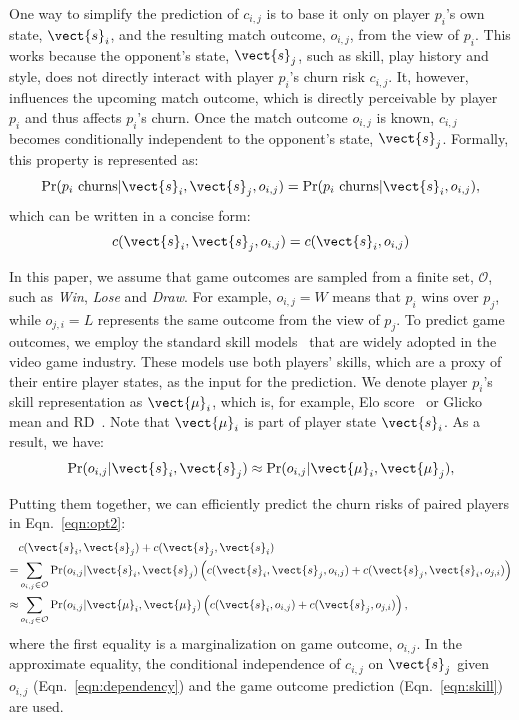 One way to simplify the prediction of $c_{i,j}$ is to base it only on player $p_i$'s own state, $\vect{s}_i$, and the resulting match outcome, $o_{i,j}$, from the view of $p_i$. This works because the opponent's state, $\vect{s}_j$, such as skill, play history and style, does not directly interact with player $p_i$'s churn risk $c_{i,j}$. It, however, influences the upcoming match outcome, which is directly perceivable by player $p_i$ and thus affects $p_i$'s churn. Once the match outcome $o_{i,j}$ is known, $c_{i,j}$ becomes conditionally independent to the opponent's state, $\vect{s}_j$. Formally, this property is represented as:
\begin{equation}\label{eqn:dependency_raw}
\Pr(p_i \text{ churns} | \vect{s}_i, \vect{s}_j, o_{i,j}) = \Pr(p_i \text{ churns} | \vect{s}_i, o_{i,j}),
\end{equation}
which can be written in a concise form:
\begin{equation}\label{eqn:dependency}
c(\vect{s}_i, \vect{s}_j, o_{i,j}) = c(\vect{s}_i, o_{i,j})
\end{equation}

In this paper, we assume that game outcomes are sampled from a finite set, $\mathcal{O}$, such as \emph{Win}, \emph{Lose} and \emph{Draw}. For example, $o_{i,j}=W$ means that $p_i$ wins over $p_j$, while $o_{j,i}=L$ represents the same outcome from the view of $p_j$. To predict game outcomes, we employ the standard skill models~\cite{elo1978rating,glickman1999parameter} that are widely adopted in the video game industry. These models use both players' skills, which are a proxy of their entire player states, as the input for the prediction. We denote player $p_i$'s skill representation as $\vect{\mu}_i$, which is, for example, Elo score~\cite{elo1978rating} or Glicko mean and RD~\cite{glickman1999parameter}. Note that $\vect{\mu}_i$ is part of player state $\vect{s}_i$.  As a result, we have:
\begin{equation}\label{eqn:skill}
\Pr(o_{i,j}|\vect{s}_i, \vect{s}_j) \approx \Pr(o_{i,j}|\vect{\mu}_i, \vect{\mu}_j),
\end{equation}

Putting them together, we can efficiently predict the churn risks of paired players in Eqn.~\ref{eqn:opt2}:
\begin{align}
&c(\vect{s}_i, \vect{s}_j) + c(\vect{s}_j, \vect{s}_i) \label{eqn:c1} \\
=& \sum\limits_{o_{i,j} \in \mathcal{O}} \Pr(o_{i,j}|\vect{s}_i, \vect{s}_j)\left( c(\vect{s}_i, \vect{s}_j, o_{i,j}) + c(\vect{s}_j, \vect{s}_i, o_{j,i}) \right) \label{eqn:c2} \\
\approx & \sum\limits_{o_{i,j} \in \mathcal{O}} \Pr(o_{i,j}|\vect{\mu}_i, \vect{\mu}_j)\left( c(\vect{s}_i, o_{i,j}) + c(\vect{s}_j, o_{j,i}) \right), \label{eqn:c3}
\end{align}
where the first equality is a marginalization on game outcome, $o_{i,j}$. In the approximate equality, the conditional independence of $c_{i,j}$ on $\vect{s}_j$ given $o_{i,j}$ (Eqn.~\ref{eqn:dependency}) and the game outcome prediction (Eqn.~\ref{eqn:skill}) are used.

